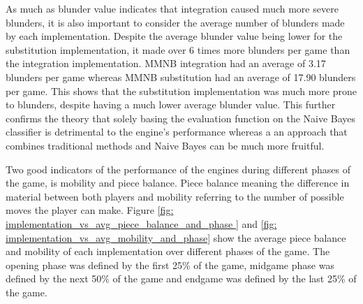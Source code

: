 



As much as blunder value indicates that integration caused much more severe blunders, it is also important to consider the average number of blunders made by each implementation. Despite the average blunder value being lower for the substitution implementation, it made over 6 times more blunders per game than the integration implementation. MMNB integration had an average of 3.17 blunders per game whereas MMNB substitution had an average of 17.90 blunders per game. This shows that the substitution implementation was much more prone to blunders, despite having a much lower average blunder value. This further 
confirms the theory that solely basing the evaluation function on the Naive Bayes classifier is detrimental to the engine's performance whereas a an approach that combines traditional methods and Naive Bayes can be much more fruitful.


Two good indicators of the performance of the engines during different phases of the game, is mobility and piece balance. Piece balance meaning the difference in material between both players and mobility referring to the number of possible moves the player can make. Figure \ref{fig: implementation_vs_avg_piece_balance_and_phase } and \ref{fig: implementation_vs_avg_mobility_and_phase} show the average piece balance and mobility of each implementation over different phases of the game. The opening phase was defined by the first 25\% of the game, midgame phase was defined by the next 50\% of the game and endgame was defined by the last 25\% of the game.

